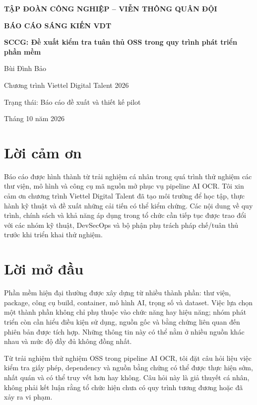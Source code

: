 \documentclass[11pt,a4paper,oneside]{report}
\newcommand{\reportauthor}{Bùi Đình Bảo}
\newcommand{\reportprogram}{Chương trình Viettel Digital Talent 2026}
\newcommand{\reporttitle}{SCCG: Đề xuất kiểm tra tuân thủ OSS trong quy trình phát triển phần mềm}
\newcommand{\reportdate}{Tháng 10 năm 2026}
\newcommand{\reportstatus}{Báo cáo đề xuất và thiết kế pilot}
\begin{document}
\begin{titlepage}
\centering
\vspace*{1.2cm}
{\Large\bfseries TẬP ĐOÀN CÔNG NGHIỆP -- VIỄN THÔNG QUÂN ĐỘI\par}
\vspace{2.8cm}
{\Large\bfseries BÁO CÁO SÁNG KIẾN VDT\par}
\vspace{1cm}
{\huge\bfseries \reporttitle\par}
\vspace{1.5cm}
{\Large \reportauthor\par}
\vspace{0.5cm}
{\large \reportprogram\par}
\vfill
{\large Trạng thái: \reportstatus\par}
\vspace{0.4cm}
{\large \reportdate\par}
\vspace{1cm}
\end{titlepage}

\chapter*{Lời cảm ơn}
Báo cáo được hình thành từ trải nghiệm cá nhân trong quá trình thử nghiệm các thư viện, mô hình và công cụ mã nguồn mở phục vụ pipeline AI OCR. Tôi xin cảm ơn chương trình Viettel Digital Talent đã tạo môi trường để học tập, thực hành kỹ thuật và đề xuất những cải tiến có thể kiểm chứng. Các nội dung về quy trình, chính sách và khả năng áp dụng trong tổ chức cần tiếp tục được trao đổi với các nhóm kỹ thuật, DevSecOps và bộ phận phụ trách pháp chế/tuân thủ trước khi triển khai thử nghiệm.

\chapter*{Lời mở đầu}
Phần mềm hiện đại thường được xây dựng từ nhiều thành phần: thư viện, package, công cụ build, container, mô hình AI, trọng số và dataset. Việc lựa chọn một thành phần không chỉ phụ thuộc vào chức năng hay hiệu năng; nhóm phát triển còn cần hiểu điều kiện sử dụng, nguồn gốc và bằng chứng liên quan đến phiên bản được tích hợp. Những thông tin này có thể nằm ở nhiều nguồn khác nhau và mức độ đầy đủ không đồng nhất.

Từ trải nghiệm thử nghiệm OSS trong pipeline AI OCR, tôi đặt câu hỏi liệu việc kiểm tra giấy phép, dependency và nguồn bằng chứng có thể được thực hiện sớm, nhất quán và có thể truy vết hơn hay không. Câu hỏi này là giả thuyết cá nhân, không phải kết luận rằng tổ chức hiện chưa có quy trình tương đương hoặc đã xảy ra vi phạm.
\end{document}

